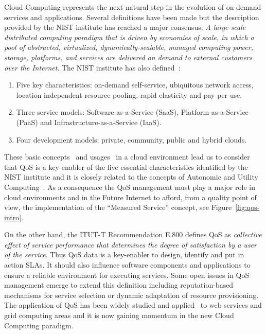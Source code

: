 Cloud Computing represents the next natural step in the evolution of on-demand services and applications. 
Several definitions have been made but the description~\cite{mell2011nist} provided by the NIST institute has reached a major consensus:  
\textit{A large-scale distributed computing paradigm that is driven by economies of scale, in which a pool of 
abstracted, virtualized, dynamically-scalable, managed computing power, storage, platforms, and services are delivered on demand to external customers over the Internet}. 
The NIST institute has also defined~\cite{mell2011nist}: 
\begin{enumerate}
 \item Five key characteristics: on-demand self-service, ubiquitous network access, location independent resource pooling, rapid elasticity and pay per use.
 \item Three service models: Software-as-a-Service (SaaS), Platform-as-a-Service (PaaS) and Infrastructure-as-a-Service (IaaS).
 \item Four development models: private, community, public and hybrid clouds. 
\end{enumerate}

These basic concepts~\cite{mell2011nist} and usages~\cite{cloud-usage} in a cloud environment lead us to consider that QoS is a key-enabler of the five essential characteristics identified by 
the NIST institute and it is closely related to the concepts of Autonomic and Utility Computing~\cite{Huebscher:2008:SAC:1380584.1380585}. 
As a consequence the QoS management must play a major role in cloud environments and in the Future Internet to 
afford, from a quality point of view, the implementation of the ``Measured Service'' concept, see Figure~\ref{fig:qos-intro}.

On the other hand, the ITUT-T Recommendation E.800 defines QoS as \textit{collective effect of service performance that determines the degree of 
satisfaction by a user of the service}. Thus QoS data is a key-enabler to design, identify and put in action SLAs. It should also influence 
software components and applications to ensure a reliable environment for executing services. Some open issues in 
QoS management emerge to extend this definition including reputation-based mechanisms for service selection or 
dynamic adaptation of resource provisioning. The application of QoS has been widely studied and 
applied~\cite{Conejero:2012:MSQ:2357487.2357591,Pedersen:2011:AMQ:2114495.2115542} to web services and grid computing areas and it is now 
gaining momentum in the new Cloud Computing paradigm. 


